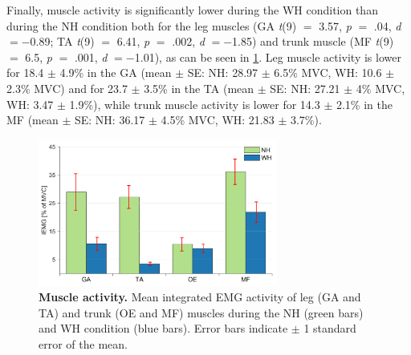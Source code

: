 \clearpage
Finally, muscle activity is significantly lower during the WH condition than during the NH condition both for the leg muscles (GA \textit{t}(9) $=$ 3.57, \textit{p} $=$ .04, \textit{d} $= -$0.89; TA \textit{t}(9) $=$ 6.41, \textit{p} $=$ .002, \textit{d} $= -$1.85) and trunk muscle (MF \textit{t}(9) $=$ 6.5, \textit{p} $=$ .001, \textit{d} $= -$1.01), as can be seen in \FigureAbbr \ref{fig:iemg}. 
Leg muscle activity is lower for 18.4 $\pm$ 4.9\% in the GA (mean $\pm$ SE: NH: 28.97 $\pm$ 6.5\% MVC, WH: 10.6 $\pm$ 2.3\% MVC) and for 23.7 $\pm$ 3.5\% in the TA (mean $\pm$ SE: NH: 27.21 $\pm$ 4\% MVC, WH: 3.47 $\pm$ 1.9\%), while trunk muscle activity is lower for 14.3 $\pm$ 2.1\% in the MF (mean $\pm$ SE: NH: 36.17 $\pm$ 4.5\% MVC, WH: 21.83 $\pm$ 3.7\%).

\begin{figure}[!htb]
	\centering
	\includegraphics[width=0.7\textwidth]{Jernej/figures/iemg}
	\caption{\textbf{Muscle activity. }Mean integrated EMG activity of leg (GA and TA) and trunk (OE and MF) muscles during the NH (green bars) and WH condition (blue bars). Error bars indicate $\pm$ 1 standard error of the mean.
	}
	\label{fig:iemg}
\end{figure}


